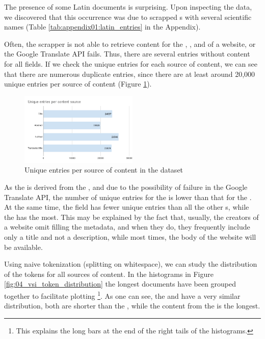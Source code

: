 The presence of some Latin documents is surprising. Upon inspecting the data, we discovered that this occurrence was due to scrapped \trafilaturaTitle{}s with several scientific names (Table \ref{tab:appendix01:latin_entries} in the Appendix).

Often, the \trafilatura{} scrapper is not able to retrieve content for the \trafilaturaTitle{}, \trafilaturaAbstract{}, and \trafilaturaFulltext{} of a website, or the Google Translate API fails. Thus, there are several entries without content for all fields. If we check the unique entries for each source of content, we can see that there are numerous duplicate entries, since there are at least around 20,000 unique entries per source of content (Figure \ref{fig:04_unique_entries_vsi}).

\begin{figure}
    \centering
    \includegraphics[width=0.50\textwidth]{Figures/04/Unique entries per content source.png}
    \caption{Unique entries per source of content in the \VSI{} dataset}
    \label{fig:04_unique_entries_vsi}
\end{figure}

As the\translationTitle{} is derived from the \translationTitle{}, and due to the possibility of failure in the Google Translate API, the number of unique entries for the \translationTitle{} is lower than that for the \trafilaturaTitle{}.
At the same time, the \trafilaturaAbstract{} field has fewer unique entries than all the other \contentType{}s, while the \trafilaturaFulltext{} has the most. This may be explained by the fact that, usually, the creators of a website omit filling the metadata, and when they do, they frequently include only a title and not a description, while most times, the body of the website will be available. 

Using naive tokenization (splitting on whitespace), we can study the distribution of the tokens for all sources of content. In the histograms in Figure \ref{fig:04_vsi_token_distribution} the longest documents have been grouped together to facilitate plotting \footnote{This explains the long bars at the end of the right tails of the histograms.}. As one can see, the \trafilaturaTitle{} and \translationTitle{} have a very similar distribution, both are shorter than the \trafilaturaAbstract{}, while the content from the \trafilaturaFulltext{} is the longest.


